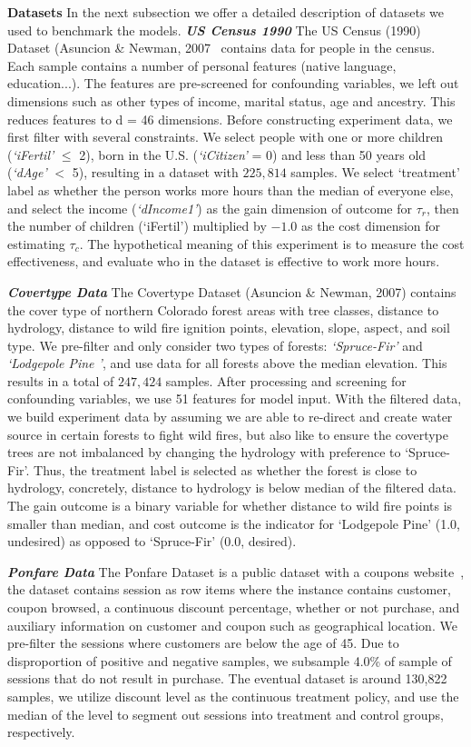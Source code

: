 \documentclass{article}
\begin{document}
\textbf{Datasets} In the next subsection we offer a detailed description of datasets we used to benchmark the models. 
\emph{\textbf{US Census 1990}} The US Census (1990) Dataset (Asuncion \& Newman, 2007~\cite{uscensulink} contains data for people in the census. Each sample contains a number of personal features (native language, education...). The features are pre-screened for confounding variables, we left out dimensions such as other types of income, marital status, age and ancestry. This reduces features to d = 46 dimensions. Before constructing experiment data, we first filter with several constraints. We select people with one or more children (\emph{`iFertil'} $\leq$ 2), born in the U.S. (\emph{`iCitizen'} = 0) and less than 50 years old (\emph{`dAge'} $<$ 5), resulting in a dataset with $225,814$ samples. We select `treatment' label as whether the person works more hours than the median of everyone else, and select the income (\emph{`dIncome1'}) as the gain dimension of outcome for $\tau_r$, then the number of children (`iFertil') multiplied by $-1.0$ as the cost dimension for estimating $\tau_c$. The hypothetical meaning of this experiment is to measure the cost effectiveness, and evaluate who in the dataset is effective to work more hours. 

\emph{\textbf{Covertype Data}} The Covertype Dataset (Asuncion \& Newman, 2007) contains the cover type of northern Colorado forest areas with tree classes,  distance to hydrology, distance to wild fire ignition points, elevation, slope, aspect, and soil type. We pre-filter and only consider two types of forests: \emph{`Spruce-Fir'} and \emph{`Lodgepole Pine '}, and use data for all forests above the median elevation. This results in a total of $247,424$ samples. After processing and screening for confounding variables, we use 51 features for model input. With the filtered data, we build experiment data by assuming we are able to re-direct and create water source in certain forests to fight wild fires, but also like to ensure the covertype trees are not imbalanced by changing the hydrology with preference to `Spruce-Fir'. Thus, the treatment label is selected as whether the forest is close to hydrology, concretely, distance to hydrology is below median of the filtered data. The gain outcome is a binary variable for whether distance to wild fire points is smaller than median, and cost outcome is the indicator for `Lodgepole Pine' (1.0, undesired) as opposed to `Spruce-Fir' (0.0, desired). 

\emph{\textbf{Ponfare Data}} The Ponfare Dataset is a public dataset with a coupons website~\cite{ponfare}, the dataset contains session as row items where the instance contains customer, coupon browsed, a continuous discount percentage, whether or not purchase, and auxiliary information on customer and coupon such as geographical location. We pre-filter the sessions where customers are below the age of 45. Due to disproportion of positive and negative samples, we subsample 4.0\% of sample of sessions that do not result in purchase. The eventual dataset is around 130,822 samples, we utilize discount level as the continuous treatment policy, and use the median of the level to segment out sessions into treatment and control groups, respectively. 
\end{document}
